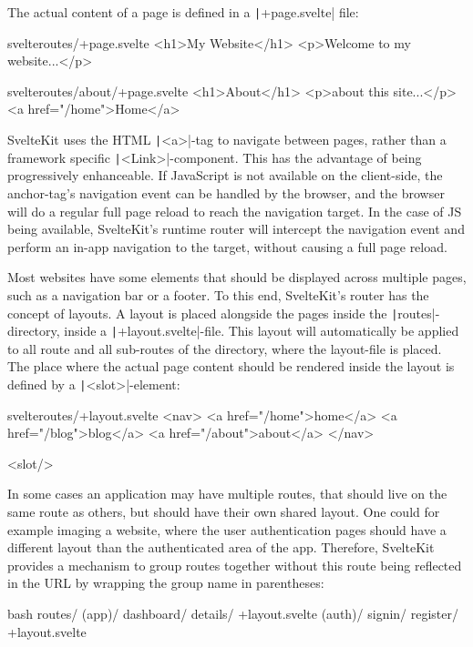 The actual content of a page is defined in a \texttt|+page.svelte| file:
\begin{myminted}{svelte}{routes/+page.svelte}
<h1>My Website</h1>
<p>Welcome to my website...</p>
\end{myminted}
\begin{myminted}{svelte}{routes/about/+page.svelte}
<h1>About</h1>
<p>about this site...</p>
<a href="/home">Home</a>
\end{myminted}

SvelteKit uses the HTML \texttt|<a>|-tag to navigate between pages, rather than a framework specific \texttt|<Link>|-component. This has the advantage of being progressively enhanceable. If JavaScript is not available on the client-side, the anchor-tag's navigation event can be handled by the browser, and the browser will do a regular full page reload to reach the navigation target. In the case of JS being available, SvelteKit's runtime router will intercept the navigation event and perform an in-app navigation to the target, without causing a full page reload.

Most websites have some elements that should be displayed across multiple pages, such as a navigation bar or a footer. To this end, SvelteKit's router has the concept of layouts. A layout is placed alongside the pages inside the \texttt|routes|-directory, inside a \texttt|+layout.svelte|-file. This layout will automatically be applied to all route and all sub-routes of the directory, where the layout-file is placed. The place where the actual page content should be rendered inside the layout is defined by a \texttt|<slot>|-element:

\begin{myminted}{svelte}{routes/+layout.svelte}
<nav>
  <a href="/home">home</a>
  <a href="/blog">blog</a>
  <a href="/about">about</a>
</nav>

<slot/>
\end{myminted}

In some cases an application may have multiple routes, that should live on the same route as others, but should have their own shared layout. One could for example imaging a website, where the user authentication pages should have a different layout than the authenticated area of the app. Therefore, SvelteKit provides a mechanism to group routes together without this route being reflected in the URL by wrapping the group name in parentheses:
\begin{myminted}[highlightlines={2,6}]{bash}{}
routes/
(app)/
  dashboard/
    details/
    +layout.svelte
  (auth)/
    signin/
    register/
    +layout.svelte
\end{myminted}

